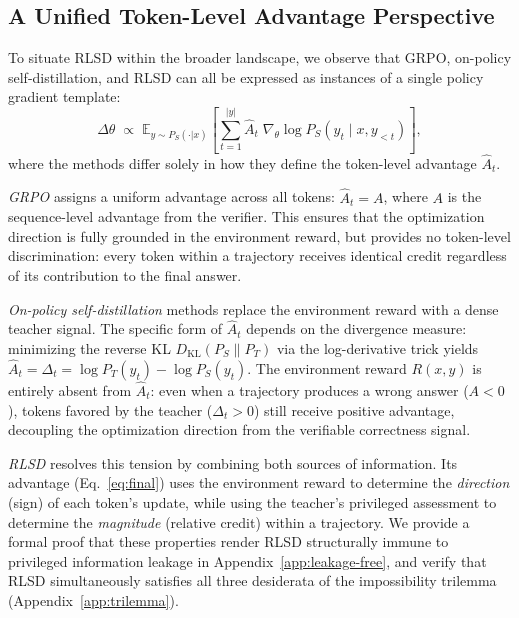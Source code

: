 \documentclass[]{jingdong}
\begin{document}
 
\subsection{A Unified Token-Level Advantage Perspective}
\label{sec:unified}
 
To situate RLSD within the broader landscape, we observe that GRPO, on-policy self-distillation, and RLSD can all be expressed as instances of a single policy gradient template:
\begin{equation}
    \Delta\theta \;\propto\; \mathbb{E}_{y \sim P_S(\cdot|x)}\!\left[\sum_{t=1}^{|y|} \hat{A}_t \;\nabla_\theta \log P_S(y_t \mid x, y_{<t})\right],
    \label{eq:unified}
\end{equation}
where the methods differ solely in how they define the token-level advantage $\hat{A}_t$. %
 
\textit{GRPO} assigns a uniform advantage across all tokens: $\hat{A}_t = A$, where $A$ is the sequence-level advantage from the verifier. This ensures that the optimization direction is fully grounded in the environment reward, but provides no token-level discrimination: every token within a trajectory receives identical credit regardless of its contribution to the final answer.
 
\textit{On-policy self-distillation} methods replace the environment reward with a dense teacher signal. The specific form of $\hat{A}_t$ depends on the divergence measure: minimizing the reverse KL $D_{\mathrm{KL}}(P_S \| P_T)$ via the log-derivative trick yields $\hat{A}_t = \Delta_t = \log P_T(y_t) - \log P_S(y_t)$.
The environment reward $R(x,y)$ is entirely absent from $\hat{A}_t$: even when a trajectory produces a wrong answer ($A < 0$), tokens favored by the teacher ($\Delta_t > 0$) still receive positive advantage, decoupling the optimization direction from the verifiable correctness signal.
 
\textit{RLSD} resolves this tension by combining both sources of information. Its advantage (Eq.~\ref{eq:final}) uses the environment reward to determine the \textit{direction} (sign) of each token's update, while using the teacher's privileged assessment to determine the \textit{magnitude} (relative credit) within a trajectory. We provide a formal proof that these properties render RLSD structurally immune to privileged information leakage in Appendix~\ref{app:leakage-free}, and verify that RLSD simultaneously satisfies all three desiderata of the impossibility trilemma (Appendix~\ref{app:trilemma}).
 
\end{document}
